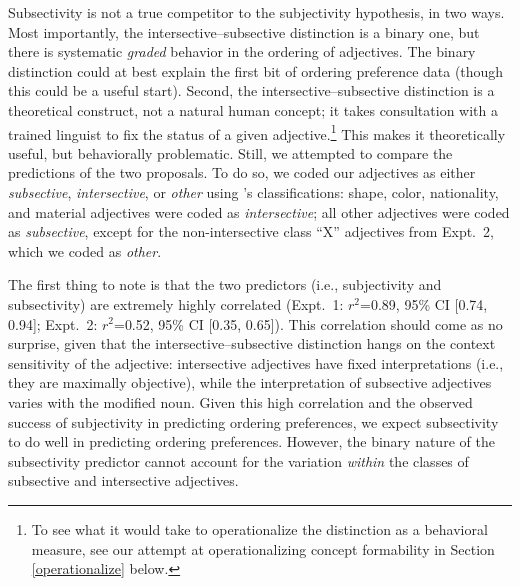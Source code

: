 \documentclass[12pt]{article}
\begin{document}
Subsectivity is not a true competitor to the subjectivity hypothesis, in two ways. 
Most importantly, the intersective--subsective distinction is a binary one, but there is systematic \emph{graded} behavior in the ordering of adjectives. The binary distinction could at best explain the first bit of ordering preference data (though this could be a useful start).
Second, the intersective--subsective distinction is a theoretical construct, not a natural human concept; it takes consultation with a trained linguist to fix the status of a given adjective.\footnote{To see what it would take to operationalize the distinction as a behavioral measure, see our attempt at operationalizing concept formability in Section \ref{operationalize} below.} This makes it theoretically useful, but behaviorally problematic.
Still, we attempted to compare the predictions of the two proposals. To do so, we coded our adjectives as either \emph{subsective}, \emph{intersective}, or \emph{other} using \citeauthor{truswell2009}'s classifications: shape, color, nationality, and material adjectives were coded as \emph{intersective}; all other adjectives were coded as \emph{subsective}, except for the non-intersective class ``X'' adjectives from Expt.~2, which we coded as \emph{other}.

The first thing to note is that the two predictors (i.e., subjectivity and subsectivity) are extremely highly correlated (Expt.~1: $r^2${=}0.89, 95\% CI [0.74,  0.94]; Expt.~2: $r^2${=}0.52, 95\% CI [0.35,  0.65]). This correlation should come as no surprise, given that the intersective--subsective distinction hangs on the context sensitivity of the adjective: intersective adjectives have fixed interpretations (i.e., they are maximally objective), while the interpretation of subsective adjectives varies with the modified noun. Given this high correlation and the observed success of subjectivity in predicting ordering preferences, we expect subsectivity to do well in predicting ordering preferences. However, the binary nature of the subsectivity predictor cannot account for the variation \emph{within} the classes of subsective and intersective adjectives. 
\end{document}
